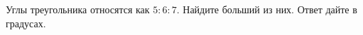 \begin{ex}
	\begin{condition}
		Углы треугольника относятся как \(5:6:7\). Найдите больший из них. Ответ дайте в градусах.
	\end{condition}
\end{ex}